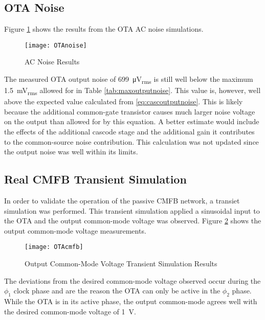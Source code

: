 \subsection{OTA Noise}
Figure \ref{fig:otanoise} shows the results from the OTA AC noise simulations.
\begin{figure}[htbp]
\centering
\texttt{[image: OTAnoise]}
\caption{AC Noise Results} 
\label{fig:otanoise}
\end{figure}
The measured OTA output noise of \SI{699}{\micro\volt_{rms}} is still well below the maximum \SI{1.5}{\milli\volt_{rms}} allowed for in Table \ref{tab:maxoutputnoise}. This value is, however, well above the expected value calculated from \ref{eq:cascoutputnoise}. This is likely because the additional common-gate transistor causes much larger noise voltage on the output than allowed for by this equation. A better estimate would include the effects of the additional cascode stage and the additional gain it contributes to the common-source noise contribution. This calculation was not updated since the output noise was well within its limits.
\subsection{Real CMFB Transient Simulation}
In order to validate the operation of the passive CMFB network, a transiet simulation was performed. This transient simulation applied a sinusoidal input to the OTA and the output common-mode voltage was observed. Figure \ref{fig:cmfbresult} shows the output common-mode voltage measurements.
\begin{figure}[htbp]
\centering
\texttt{[image: OTAcmfb]}
\caption{Output Common-Mode Voltage Transient Simulation Results} 
\label{fig:cmfbresult}
\end{figure}
The deviations from the desired common-mode voltage observed occur during the $\phi_{1}$ clock phase and are the reason the OTA can only be active in the $\phi_{2}$ phase. While the OTA is in its active phase, the output common-mode agrees well with the desired common-mode voltage of \SI{1}{\volt}.
